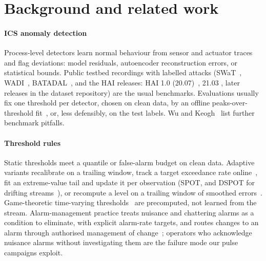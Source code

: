 \documentclass[sigconf]{acmart}
\begin{document}
\section{Background and related work}

\paragraph{ICS anomaly detection}
Process-level detectors learn normal behaviour from sensor and actuator traces and flag deviations:
model residuals, autoencoder reconstruction errors, or statistical bounds. Public testbed recordings
with labelled attacks (SWaT~\cite{goh2016swat}, WADI~\cite{ahmed2017wadi},
BATADAL~\cite{taormina2018batadal}, and the HAI releases: HAI 1.0 (20.07)~\cite{shin2020hai}, 21.03
\cite{shin2021hai}, later releases in the dataset repository) are the usual benchmarks. Evaluations
usually fix one threshold per detector, chosen on clean data, by an offline peaks-over-threshold
fit~\cite{su2019omni}, or, less defensibly, on the test labels. Wu and Keogh~\cite{wu2023benchmarks}
list further benchmark pitfalls.

\paragraph{Threshold rules}
Static thresholds meet a quantile or false-alarm budget on clean data. Adaptive variants recalibrate on
a trailing window, track a target exceedance rate online~\cite{gibbs2021aci}, fit an extreme-value tail
and update it per observation (SPOT, and DSPOT for drifting streams~\cite{siffer2017spot}), or
recompute a level on a trailing window of smoothed errors~\cite{hundman2018telemanom}. Game-theoretic
time-varying thresholds~\cite{ghafouri2016thresholds} are precomputed, not learned from the stream.
Alarm-management practice treats nuisance and chattering alarms as a condition to eliminate, with
explicit alarm-rate targets, and routes changes to an alarm through authorised management of
change~\cite{isa182, eemua191}; operators who acknowledge nuisance alarms without investigating them are
the failure mode our pulse campaigns exploit.
\end{document}
